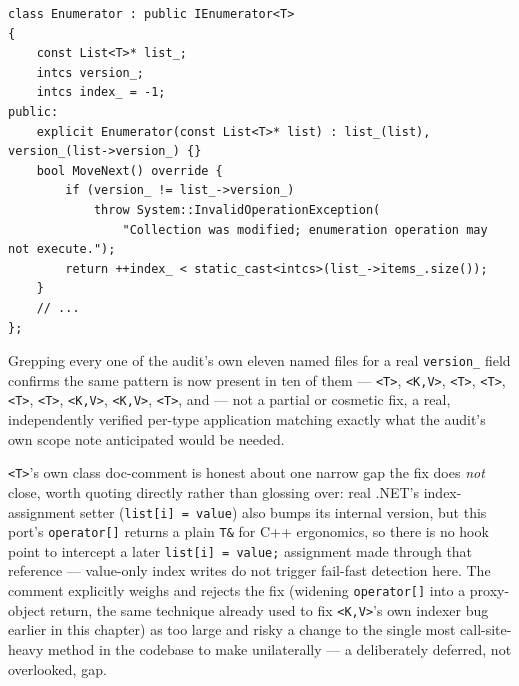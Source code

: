 \begin{lstlisting}
class Enumerator : public IEnumerator<T>
{
    const List<T>* list_;
    intcs version_;
    intcs index_ = -1;
public:
    explicit Enumerator(const List<T>* list) : list_(list), version_(list->version_) {}
    bool MoveNext() override {
        if (version_ != list_->version_)
            throw System::InvalidOperationException(
                "Collection was modified; enumeration operation may not execute.");
        return ++index_ < static_cast<intcs>(list_->items_.size());
    }
    // ...
};
\end{lstlisting}

Grepping every one of the audit's own eleven named files for a real \texttt{version\_} field
confirms the same pattern is now present in ten of them ---
\allowbreak{}\texttt{<T>}, \allowbreak{}\texttt{<K,V>},
\allowbreak{}\texttt{<T>}, \allowbreak{}\texttt{<T>},
\allowbreak{}\texttt{<T>}, \allowbreak{}\texttt{<T>},
\allowbreak{}\texttt{<K,V>},
\allowbreak{}\texttt{<K,V>}, \allowbreak{}\texttt{<T>},
and  --- not a partial or cosmetic fix, a real, independently
verified per-type application matching exactly what the audit's own scope note anticipated
would be needed.

\allowbreak{}\texttt{<T>}'s own class doc-comment is honest about one narrow gap
the fix does \emph{not} close, worth quoting directly rather than glossing over: real .NET's
index-assignment setter (\texttt{list[i] = value}) also bumps its internal version, but this
port's \texttt{operator[]} returns a plain \texttt{T\&} for C++ ergonomics, so there is no hook
point to intercept a later \texttt{list[i] = value;} assignment made through that reference ---
value-only index writes do not trigger fail-fast detection here. The comment explicitly weighs
and rejects the fix (widening \texttt{operator[]} into a proxy-object return, the same technique
already used to fix \allowbreak{}\texttt{<K,V>}'s own indexer bug earlier in
this chapter) as too large and risky a change to the single most call-site-heavy method in the
codebase to make unilaterally --- a deliberately deferred, not overlooked, gap.


